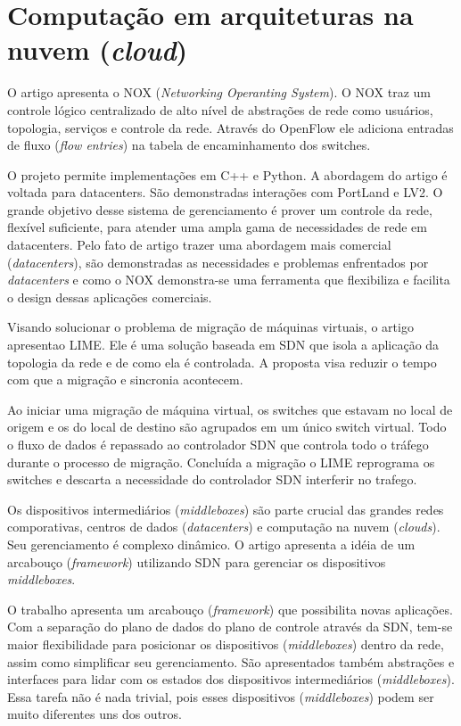 \section{Computação em arquiteturas na nuvem (\emph{cloud})}

O artigo \citep{arsalan2009applying} apresenta o NOX 
(\emph{Networking Operanting System}). 
O NOX traz um controle lógico centralizado de alto nível de abstrações de 
rede como usuários, topologia, serviços e controle da rede. 
Através do OpenFlow ele adiciona entradas de fluxo (\emph{flow entries}) na 
tabela de encaminhamento dos switches. 

O projeto permite implementações em C++ e Python. 
A abordagem do artigo é voltada para datacenters. 
São demonstradas interações com PortLand e LV2. 
O grande objetivo desse sistema de gerenciamento é prover um controle da rede,
flexível suficiente, para atender uma ampla gama de necessidades de rede em 
datacenters. 
Pelo fato de artigo trazer uma abordagem mais comercial (\emph{datacenters}), 
são demonstradas as necessidades e problemas enfrentados por 
\emph{datacenters} e como o NOX demonstra-se uma ferramenta que flexibiliza 
e facilita o design dessas aplicações comerciais.

Visando solucionar o problema de migração de máquinas virtuais, 
o artigo \citep{erik2012live} apresentao LIME.
Ele é uma solução baseada em SDN que isola a aplicação da topologia da rede e 
de como ela é controlada. 
A proposta visa reduzir o tempo com que a migração e sincronia acontecem.

Ao iniciar uma migração de máquina virtual, os switches que estavam no local 
de origem e os do local de destino são agrupados em um único switch virtual. 
Todo o fluxo de dados é repassado ao controlador SDN que controla todo o 
tráfego durante o processo de migração. 
Concluída a migração o LIME reprograma os switches e descarta a necessidade 
do controlador SDN interferir no trafego.

Os dispositivos intermediários (\emph{middleboxes}) são parte crucial das 
grandes redes comporativas, centros de dados 
(\emph{datacenters}) e computação na nuvem (\emph{clouds}). 
Seu gerenciamento é complexo dinâmico.
O artigo \citep{aaron2012toward} apresenta a idéia de um arcabouço 
(\emph{framework}) utilizando SDN para gerenciar os dispositivos 
\emph{middleboxes}. 

O trabalho apresenta um arcabouço (\emph{framework}) que possibilita 
novas aplicações.
Com a separação do plano de dados do plano de controle através da SDN, 
tem-se maior flexibilidade para posicionar os dispositivos (\emph{middleboxes})
dentro da rede, assim como simplificar seu gerenciamento. 
São apresentados também abstrações e interfaces para lidar
com os estados dos dispositivos intermediários (\emph{middleboxes}). 
Essa tarefa não é nada trivial, pois esses dispositivos (\emph{middleboxes}) 
podem ser muito diferentes uns dos outros.

